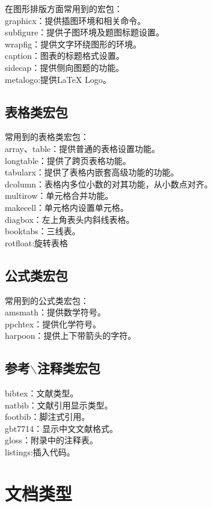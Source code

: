 \documentclass[12pt]{book}
\begin{document}
在图形排版方面常用到的宏包：\\
graphicx：提供插图环境和相关命令。\\
subfigure：提供子图环境及题图标题设置。\\
wrapfig：提供文字环绕图形的环境。\\
caption：图表的标题格式设置。\\
sidecap：提供侧向图题的功能。 \\
metalogo:提供\LaTeX{} Logo。

\section{表格类宏包}


常用到的表格类宏包：\\
array、table：提供普通的表格设置功能。\\
longtable：提供了跨页表格功能。\\
tabularx：提供了表格内嵌套高级功能的功能。\\
dcolumn：表格内多位小数的对其功能，从小数点对齐。\\
multirow：单元格合并功能。\\
makecell：单元格内设置单元格。\\
diagbox：左上角表头内斜线表格。\\
booktabs：三线表。 \\
rotfloat:旋转表格

\section{公式类宏包}

常用到的公式类宏包：\\
amsmath：提供数学符号。\\
ppchtex：提供化学符号。\\
harpoon：提供上下带箭头的字符。

\section{参考$\backslash$注释类宏包}

bibtex：文献类型。\\
natbib：文献引用显示类型。\\
footbib：脚注式引用。\\
gbt7714：显示中文文献格式。\\
gloss：附录中的注释表。\\
listings:插入代码。

\chapter{文档类型}
\end{document}
